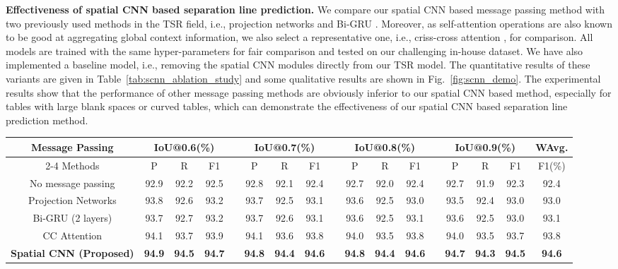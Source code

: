 \documentclass[final,3p,times,twocolumn]{elsarticle}
\begin{document}
\textbf{Effectiveness of spatial CNN based separation line prediction.} We compare our spatial CNN based message passing method with two previously used methods in the TSR field, i.e., projection networks \cite{tensmeyer2019deep} and Bi-GRU \cite{khan2019table}. Moreover, as self-attention operations are also known to be good at aggregating global context information, we also select a representative one, i.e., criss-cross attention \cite{huang2019ccnet}, for comparison. All models are trained with the same hyper-parameters for fair comparison and tested on our challenging in-house dataset. We have also implemented a baseline model, i.e., removing the spatial CNN modules directly from our TSR model. The quantitative results of these variants are given in Table~\ref{tab:scnn_ablation_study} and some qualitative results are shown in Fig.~\ref{fig:scnn_demo}. The experimental results show that the performance of other message passing methods are obviously inferior to our spatial CNN based method, especially for tables with large blank spaces or curved tables, which can demonstrate the effectiveness of our spatial CNN based separation line prediction method. 
\begin{table*}[t]
    \setlength{\tabcolsep}{4.5pt}
    \footnotesize
    \centering
    \caption{Comparison of different message passing methods.}
    \label{tab:scnn_ablation_study}
    \begin{tabular}{ c  c  c  c  c  c  c  c  c  c  c  c  c  c  c  c  c}
        \toprule
        Message Passing & \multicolumn{3}{c}{IoU@0.6(\%)} && \multicolumn{3}{c}{IoU@0.7(\%)} &&
        \multicolumn{3}{c}{IoU@0.8(\%)} &&
        \multicolumn{3}{c}{IoU@0.9(\%)} & WAvg. \\\cline{2-4}\cline{6-8}\cline{10-12}\cline{14-16}
        Methods & P & R & F1 && P & R & F1 && P & R & F1 && P & R & F1 & F1(\%)\\
        \midrule
        No message passing & 92.9 & 92.2 & 92.5 && 92.8 & 92.1 & 92.4 && 92.7 & 92.0 & 92.4 && 92.7 & 91.9 & 92.3 & 92.4 \\
        Projection Networks \cite{tensmeyer2019deep} & 93.8 & 92.6 & 93.2 && 93.7 & 92.5 & 93.1 && 93.6 & 92.5 & 93.0 && 93.5 & 92.4 & 93.0 & 93.0 \\
        Bi-GRU (2 layers) \cite{khan2019table} & 93.7 & 92.7 & 93.2 && 93.7 & 92.6 & 93.1 && 93.6 & 92.5 & 93.1 && 93.6 & 92.5 & 93.0 & 93.1 \\
        CC Attention \cite{huang2019ccnet} & 94.1 & 93.7 & 93.9 && 94.1 & 93.6 & 93.8 && 94.0 & 93.5 & 93.8 && 94.0 & 93.5 & 93.7 & 93.8 \\
        \textbf{Spatial CNN (Proposed)} & \textbf{94.9} & \textbf{94.5} & \textbf{94.7} && \textbf{94.8} & \textbf{94.4} & \textbf{94.6} && \textbf{94.8} & \textbf{94.4} & \textbf{94.6} && \textbf{94.7} & \textbf{94.3} & \textbf{94.5} & \textbf{94.6} \\
        \bottomrule
    \end{tabular}
\end{table*}
\end{document}
